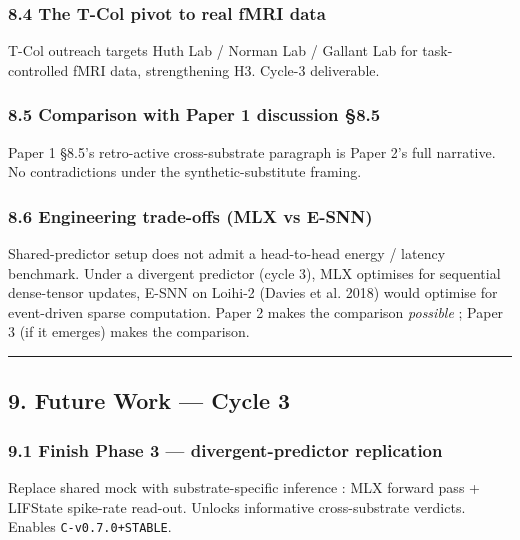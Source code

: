\documentclass[
]{article}
\begin{document}
\subsubsection{8.4 The T-Col pivot to real fMRI
data}\label{the-t-col-pivot-to-real-fmri-data}

T-Col outreach targets Huth Lab / Norman Lab / Gallant Lab for
task-controlled fMRI data, strengthening H3. Cycle-3 deliverable.

\subsubsection{8.5 Comparison with Paper 1 discussion
§8.5}\label{comparison-with-paper-1-discussion-8.5}

Paper 1 §8.5's retro-active cross-substrate paragraph is Paper 2's full
narrative. No contradictions under the synthetic-substitute framing.

\subsubsection{8.6 Engineering trade-offs (MLX vs
E-SNN)}\label{engineering-trade-offs-mlx-vs-e-snn}

Shared-predictor setup does not admit a head-to-head energy / latency
benchmark. Under a divergent predictor (cycle 3), MLX optimises for
sequential dense-tensor updates, E-SNN on Loihi-2 ({Davies et al.} 2018)
would optimise for event-driven sparse computation. Paper 2 makes the
comparison \emph{possible} ; Paper 3 (if it emerges) makes the
comparison.

\begin{center}\rule{0.5\linewidth}{0.5pt}\end{center}

\subsection{9. Future Work --- Cycle 3}\label{future-work-cycle-3}

\subsubsection{9.1 Finish Phase 3 --- divergent-predictor
replication}\label{finish-phase-3-divergent-predictor-replication}

Replace shared mock with substrate-specific inference : MLX forward pass
+ LIFState spike-rate read-out. Unlocks informative cross-substrate
verdicts. Enables \texttt{C-v0.7.0+STABLE}.
\end{document}
